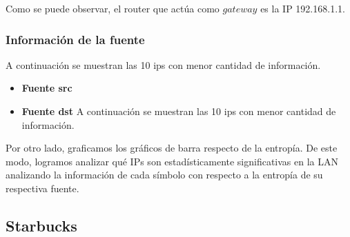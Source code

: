 \documentclass[10pt, a4paper]{article}
\begin{document}
Como se puede observar, el router que actúa como $gateway$ es la IP 192.168.1.1.

\subsubsection{Información de la fuente}

A continuaci\'on se muestran las 10 ips con menor cantidad de informaci\'on.

\begin{itemize}

\item \textbf{Fuente src}
%
\vspace{2cm}

\item \textbf{Fuente dst}
A continuaci\'on se muestran las 10 ips con menor cantidad de informaci\'on.

%
\vspace{2cm}
\end{itemize}

Por otro lado, graficamos los gráficos de barra respecto de la entropía. De este modo, logramos analizar qué IPs son estadísticamente significativas en la LAN analizando la información de cada símbolo con respecto a la entropía de su respectiva fuente.

\subsection{Starbucks}
\end{document}
